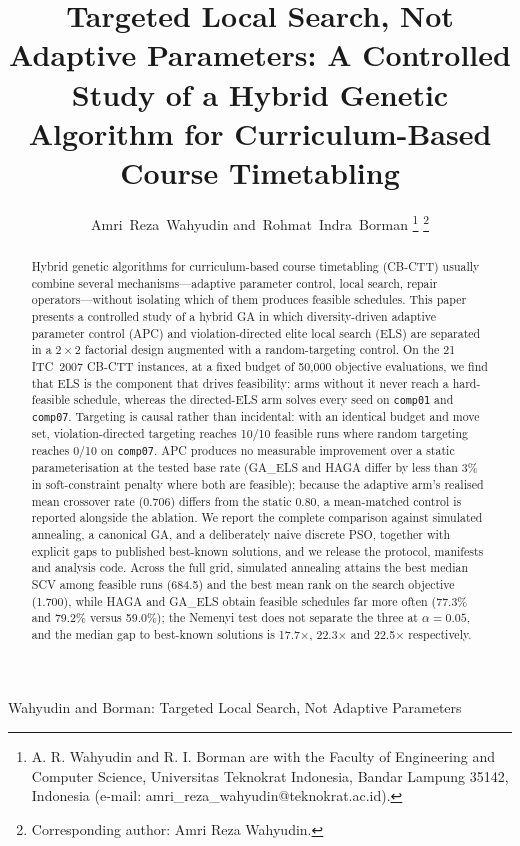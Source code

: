 \documentclass[journal]{IEEEtran}
\newcommand{\code}[1]{\texttt{#1}}
\begin{document}
\title{Targeted Local Search, Not Adaptive Parameters: A Controlled Study of a Hybrid Genetic Algorithm for Curriculum-Based Course Timetabling}

\author{Amri~Reza~Wahyudin
        and~Rohmat~Indra~Borman%
\thanks{A. R. Wahyudin and R. I. Borman are with the Faculty of Engineering and Computer Science, Universitas Teknokrat Indonesia, Bandar Lampung 35142, Indonesia (e-mail: amri\_reza\_wahyudin@teknokrat.ac.id).}%
\thanks{Corresponding author: Amri Reza Wahyudin.}%
}

%
{Wahyudin and Borman: Targeted Local Search, Not Adaptive Parameters}

\maketitle

\begin{abstract}
Hybrid genetic algorithms for curriculum-based course timetabling (CB-CTT) usually combine several mechanisms---adaptive parameter control, local search, repair operators---without isolating which of them produces feasible schedules. This paper presents a controlled study of a hybrid GA in which diversity-driven adaptive parameter control (APC) and violation-directed elite local search (ELS) are separated in a $2\times2$ factorial design augmented with a random-targeting control. On the 21 ITC~2007 CB-CTT instances, at a fixed budget of 50{,}000 objective evaluations, we find that ELS is the component that drives feasibility: arms without it never reach a hard-feasible schedule, whereas the directed-ELS arm solves every seed on \code{comp01} and \code{comp07}. Targeting is causal rather than incidental: with an identical budget and move set, violation-directed targeting reaches 10/10 feasible runs where random targeting reaches 0/10 on \code{comp07}. APC produces no measurable improvement over a static parameterisation at the tested base rate (GA\_ELS and HAGA differ by less than 3\% in soft-constraint penalty where both are feasible); because the adaptive arm's realised mean crossover rate (0.706) differs from the static 0.80, a mean-matched control is reported alongside the ablation. We report the complete comparison against simulated annealing, a canonical GA, and a deliberately naive discrete PSO, together with explicit gaps to published best-known solutions, and we release the protocol, manifests and analysis code. Across the full grid, simulated annealing attains the best median SCV among feasible runs (684.5) and the best mean rank on the search objective (1.700), while HAGA and GA\_ELS obtain feasible schedules far more often (77.3\% and 79.2\% versus 59.0\%); the Nemenyi test does not separate the three at $\alpha=0.05$, and the median gap to best-known solutions is 17.7$\times$, 22.3$\times$ and 22.5$\times$ respectively.
\end{abstract}
\end{document}
